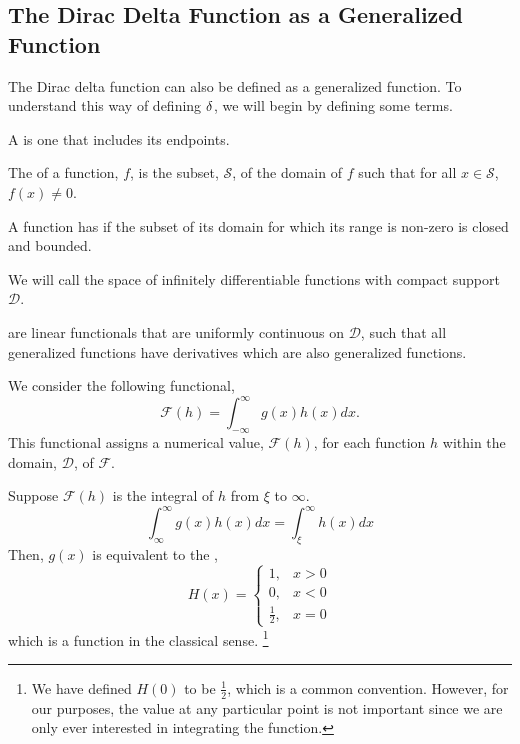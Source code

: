 \subsection{The Dirac Delta Function as a Generalized Function}
The Dirac delta function can also be defined as a generalized function. To understand this way of defining \(\delta\), we will begin by defining some terms.

\begin{definition}
     A  is one that includes its endpoints.
\end{definition}

\begin{definition}
    The  of a function, \(f\), is the subset, \(\mathcal{S}\), of the domain of \(f\) such that for all \(x\in \mathcal{S}\), \(f(x) \neq 0\).
\end{definition}

\begin{definition}
    A function has  if the subset of its domain for which its range is non-zero is closed and bounded.
\end{definition}
We will call the space of infinitely differentiable functions with compact support \(\mathcal{D}\).

\begin{definition}
     are linear functionals that are uniformly continuous on \(\mathcal{D}\), such that all generalized functions have derivatives which are also generalized functions.
\end{definition}

We consider the following functional,
\begin{equation}\label{eq:generalizedFunction}
    \mathcal{F}(h) = \int_{-\infty}^{\infty} g(x)h(x)dx.
\end{equation}
This functional assigns a numerical value, \(\mathcal{F}(h)\), for each function \(h\) within the domain, \(\mathcal{D}\), of \(\mathcal{F}\).

\begin{example}
    Suppose \(\mathcal{F}(h)\) is the integral of \(h\) from \(\xi\) to \(\infty\).
    \begin{equation}
        \int_{\infty}^{\infty} g(x)h(x)dx = \int_{\xi}^{\infty} h(x) dx
    \end{equation}
    Then, \(g(x)\) is equivalent to the ,
    \begin{equation}
        H(x) = \begin{cases}
            1, & x>0\\
            0, & x<0\\
            \frac{1}{2}, & x=0
        \end{cases}
    \end{equation}
    which is a function in the classical sense. \footnote{We have defined \(H(0)\) to be \(\frac{1}{2}\), which is a common convention. However, for our purposes, the value at any particular point is not important since we are only ever interested in integrating the function.}    
\end{example}

